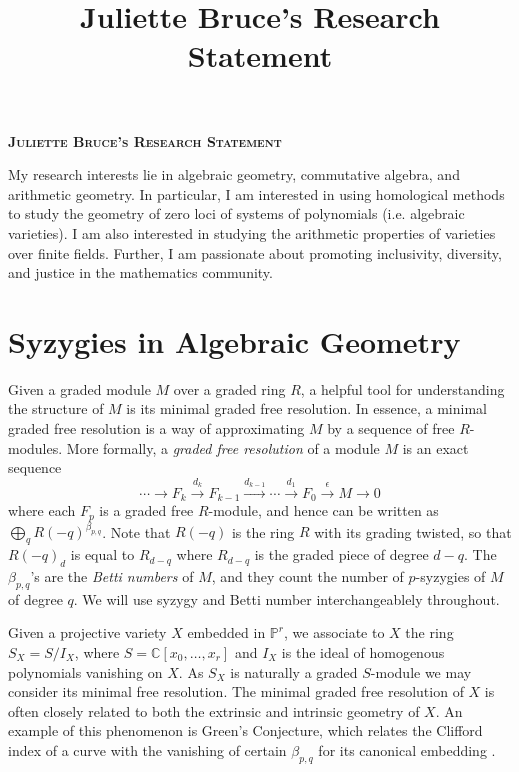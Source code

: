 \documentclass[11pt,reqno]{amsart}
\title{Juliette Bruce's Research Statement}
\theoremstyle{remark}
\newcommand{\C}{\mathbb{C}}
\renewcommand{\P}{\mathbb{P}}
\begin{document}
 

\begingroup  
  \centering
  \large\scshape\bfseries Juliette Bruce's Research Statement\\[1em]
\endgroup


\setcounter{section}{0}

My research interests lie in algebraic geometry, commutative algebra, and arithmetic geometry. In particular, I am interested in using homological methods to study the geometry of zero loci of systems of polynomials (i.e. algebraic varieties). I am also interested in studying the arithmetic properties of varieties over finite fields. Further, I am passionate about promoting inclusivity, diversity, and justice in the mathematics community.

\section{Syzygies in Algebraic Geometry}

Given a graded module $M$ over a graded ring $R$, a helpful tool for understanding the structure of $M$ is its minimal graded free resolution. In essence, a minimal graded free resolution is a way of approximating $M$ by a sequence of free $R$-modules. More formally, a \textit{graded free resolution} of a module $M$ is an exact sequence 
\[
\cdots \xrightarrow{} F_{k} \xrightarrow{d_{k}} F_{k-1} \xrightarrow{d_{k-1}} \cdots \xrightarrow{d_{1}} F_{0}\xrightarrow{\epsilon}M\xrightarrow{} 0
\]
where each $F_{p}$ is a graded free $R$-module, and hence can be written as $\bigoplus_{q}R(-q)^{\beta_{p,q}}$. Note that $R(-q)$ is the ring $R$ with its grading twisted, so that $R(-q)_{d}$ is equal to $R_{d-q}$ where $R_{d-q}$ is the graded piece of degree $d-q$. The $\beta_{p,q}$'s are the \textit{Betti numbers} of $M$, and they count the number of $p$-syzygies of $M$ of degree $q$. We will use syzygy and Betti number interchangeablely throughout. 

Given a projective variety $X$ embedded in $\P^r$, we associate to $X$ the ring $S_X=S/I_X$, where $S=\C[x_0,\ldots,x_r]$ and $I_X$ is the ideal of homogenous polynomials vanishing on $X$. As $S_X$ is naturally a graded $S$-module we may consider its minimal free resolution. The minimal graded free resolution of $X$ is often closely related to both the extrinsic and intrinsic geometry of $X$.  An example of this phenomenon
 is Green's Conjecture, which relates the Clifford index of a curve with the vanishing of certain $\beta_{p,q}$ for its canonical embedding \cite{voisin02, voisin05, aproduFarkas19}.
\end{document}
